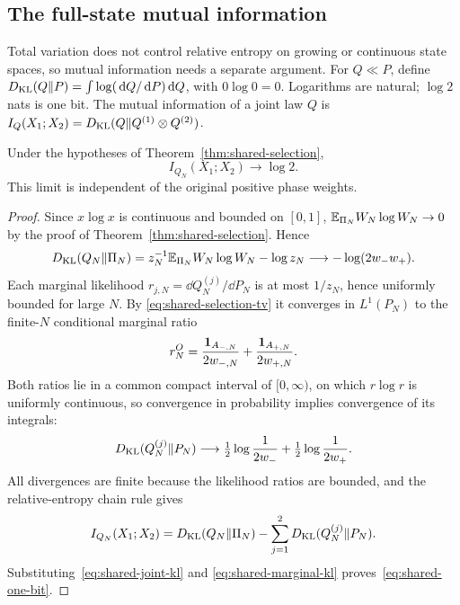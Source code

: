 \subsection{The full-state mutual information}
\label{subsec:shared-information}

Total variation does not control relative entropy on growing or
continuous state spaces, so mutual information needs a separate
argument. For $Q\ll P$, define
$D_{\mathrm{KL}}(Q\Vert P)=\int\log(\,\mathrm d Q/\,\mathrm d P)\,\mathrm d Q$, with $0\log0=0$.
Logarithms are natural; $\log2$ nats is one bit. The mutual
information of a joint law $Q$ is
$I_Q(X_1;X_2)=D_{\mathrm{KL}}(Q\Vert Q^{(1)}\otimes Q^{(2)})$.

\begin{proposition}
\label{prop:shared-one-bit}
Under the hypotheses of Theorem~\ref{thm:shared-selection},
\begin{equation}
 I_{Q_N}(X_1;X_2)\longrightarrow\log2.
 \label{eq:shared-one-bit}
\end{equation}
This limit is independent of the original positive phase weights.
\end{proposition}
\begin{proof}
Since $x\log x$ is continuous and bounded on $[0,1]$,
$\mathbb E_{\Pi_N}W_N\log W_N\to0$ by the proof of
Theorem~\ref{thm:shared-selection}. Hence
\begin{equation}
 D_{\mathrm{KL}}(Q_N\Vert\Pi_N)
 =z_N^{-1}\mathbb E_{\Pi_N}W_N\log W_N-\log z_N
 \longrightarrow-\log(2w_-w_+).
 \label{eq:shared-joint-kl}
\end{equation}
Each marginal likelihood $r_{j,N}=\dd Q_N^{(j)}/\dd P_N$ is at most
$1/z_N$, hence uniformly bounded for large $N$. By
\eqref{eq:shared-selection-tv} it converges in $L^1(P_N)$ to the
finite-$N$ conditional marginal ratio
\[
 r_N^O=\frac{\mathbf 1_{A_{-,N}}}{2w_{-,N}}
             +\frac{\mathbf 1_{A_{+,N}}}{2w_{+,N}}.
\]
Both ratios lie in a common compact interval of $[0,\infty)$, on which
$r\log r$ is uniformly continuous, so convergence in probability
implies convergence of its integrals:
\begin{equation}
 D_{\mathrm{KL}}(Q_N^{(j)}\Vert P_N)
       \longrightarrow\tfrac12\log\frac1{2w_-}
                        +\tfrac12\log\frac1{2w_+}.
 \label{eq:shared-marginal-kl}
\end{equation}
All divergences are finite because the likelihood ratios are bounded,
and the relative-entropy chain rule gives
\begin{equation}
 I_{Q_N}(X_1;X_2)=D_{\mathrm{KL}}(Q_N\Vert\Pi_N)
                   -\sum_{j=1}^2D_{\mathrm{KL}}(Q_N^{(j)}\Vert P_N).
 \label{eq:shared-kl-chain}
\end{equation}
Substituting~\eqref{eq:shared-joint-kl} and
\eqref{eq:shared-marginal-kl} proves~\eqref{eq:shared-one-bit}.
\end{proof}

